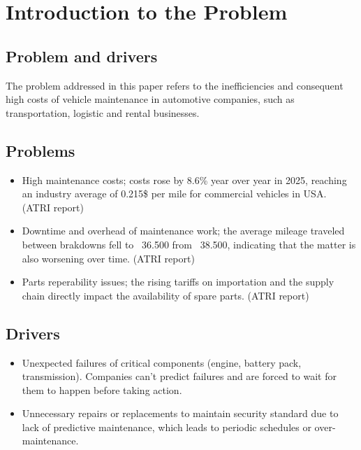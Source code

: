 \documentclass[11pt,a4paper]{article}
\begin{document}
\tableofcontents
\newpage

\section{Introduction to the Problem}
\subsection{Problem and drivers}
\noindent The problem addressed in this paper refers to the inefficiencies and consequent high costs of vehicle maintenance in automotive companies,
such as transportation, logistic and rental businesses.

\subsection*{Problems}
\begin{itemize}
    \item High maintenance costs; costs rose by 8.6\% year over year in 2025, reaching an industry average of 0.215\$ per mile for commercial vehicles in USA. (ATRI report)
    \item Downtime and overhead of maintenance work; the average mileage traveled between brakdowns fell to ~36.500 from ~38.500, indicating that the matter is also worsening over time. (ATRI report)
    \item Parts reperability issues; the rising tariffs on importation and the supply chain directly impact the availability of spare parts. (ATRI report)
\end{itemize}

\subsection*{Drivers}
\begin{itemize}
    \item Unexpected failures of critical components (engine, battery pack, transmission). Companies can't predict failures and are forced to wait for them to happen before taking action.
    \item Unnecessary repairs or replacements to maintain security standard due to lack of predictive maintenance, which leads to periodic schedules or over-maintenance.
\end{itemize}
\end{document}
